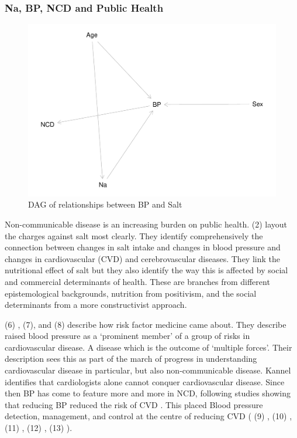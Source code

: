 \documentclass[
]{article}
\begin{document}
\hypertarget{na-bp-ncd-and-public-health}{%
\subsubsection{Na, BP, NCD and Public
Health}\label{na-bp-ncd-and-public-health}}

\begin{figure}
\centering
\includegraphics{methodandresults_files/figure-latex/fig-dagNa-1.pdf}
\caption{DAG of relationships between BP and Salt}
\end{figure}

Non-communicable disease is an increasing burden on public health. (2)
layout the charges against salt most clearly. They identify
comprehensively the connection between changes in salt intake and
changes in blood pressure and changes in cardiovascular (CVD) and
cerebrovascular diseases. They link the nutritional effect of salt but
they also identify the way this is affected by social and commercial
determinants of health. These are branches from different
epistemological backgrounds, nutrition from positivism, and the social
determinants from a more constructivist approach.

(6) , (7), and (8) describe how risk factor medicine came about. They
describe raised blood pressure as a `prominent member' of a group of
risks in cardiovascular disease. A disease which is the outcome of
`multiple forces'. Their description sees this as part of the march of
progress in understanding cardiovascular disease in particular, but also
non-communicable disease. Kannel identifies that cardiologists alone
cannot conquer cardiovascular disease. Since then BP has come to feature
more and more in NCD, following studies showing that reducing BP reduced
the risk of CVD . This placed Blood pressure detection, management, and
control at the centre of reducing CVD ( (9) , (10) , (11) , (12) , (13)
).
\end{document}
